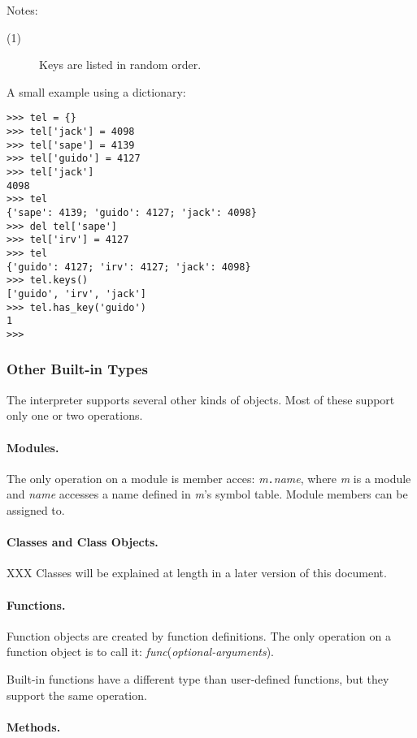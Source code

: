 \noindent
Notes:
\begin{description}
\item[(1)]
Keys are listed in random order.
\end{description}

A small example using a dictionary:
\bcode\begin{verbatim}
>>> tel = {}
>>> tel['jack'] = 4098
>>> tel['sape'] = 4139
>>> tel['guido'] = 4127
>>> tel['jack']
4098
>>> tel
{'sape': 4139; 'guido': 4127; 'jack': 4098}
>>> del tel['sape']
>>> tel['irv'] = 4127
>>> tel
{'guido': 4127; 'irv': 4127; 'jack': 4098}
>>> tel.keys()
['guido', 'irv', 'jack']
>>> tel.has_key('guido')
1
>>> 
\end{verbatim}\ecode
\subsubsection{Other Built-in Types}

The interpreter supports several other kinds of objects.
Most of these support only one or two operations.

\paragraph{Modules.}

The only operation on a module is member acces: {\em m}{\tt .}{\em name},
where {\em m} is a module and {\em name} accesses a name defined in
{\em m}'s symbol table.
Module members can be assigned to.

\paragraph{Classes and Class Objects.}

XXX Classes will be explained at length in a later version of this
document.

\paragraph{Functions.}

Function objects are created by function definitions.
The only operation on a function object is to call it:
{\em func}({\em optional-arguments}).

Built-in functions have a different type than user-defined functions,
but they support the same operation.

\paragraph{Methods.}

